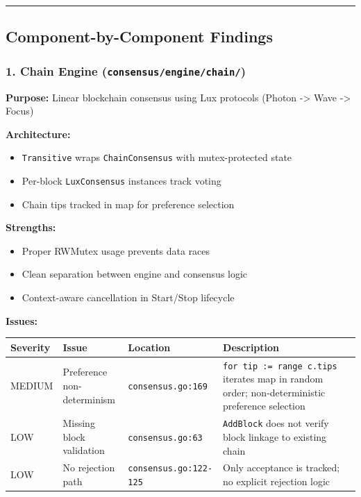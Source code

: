 \documentclass[
]{article}
\newcounter{none} %
\providecommand{\tightlist}{%
  \setlength{\itemsep}{0pt}\setlength{\parskip}{0pt}}
\begin{document}
\begin{center}\rule{0.5\linewidth}{0.5pt}\end{center}

\subsection{Component-by-Component
Findings}\label{component-by-component-findings}

\subsubsection{\texorpdfstring{1. Chain Engine
(\texttt{consensus/engine/chain/})}{1. Chain Engine (consensus/engine/chain/)}}\label{1-chain-engine-consensusenginechain}

\textbf{Purpose:} Linear blockchain consensus using Lux protocols
(Photon -\textgreater{} Wave -\textgreater{} Focus)

\textbf{Architecture:}

\begin{itemize}
\tightlist
\item
  \texttt{Transitive} wraps \texttt{ChainConsensus} with mutex-protected
  state
\item
  Per-block \texttt{LuxConsensus} instances track voting
\item
  Chain tips tracked in map for preference selection
\end{itemize}

\textbf{Strengths:}

\begin{itemize}
\tightlist
\item
  Proper RWMutex usage prevents data races
\item
  Clean separation between engine and consensus logic
\item
  Context-aware cancellation in Start/Stop lifecycle
\end{itemize}

\textbf{Issues:}

{\def\LTcaptype{none} %
\begin{longtable}[]{@{}llll@{}}
\toprule\noalign{}
Severity & Issue & Location & Description \\
\midrule\noalign{}
\endhead
\bottomrule\noalign{}
\endlastfoot
MEDIUM & Preference non-determinism & \texttt{consensus.go:169} &
\texttt{for\ tip\ :=\ range\ c.tips} iterates map in random order;
non-deterministic preference selection \\
LOW & Missing block validation & \texttt{consensus.go:63} &
\texttt{AddBlock} does not verify block linkage to existing chain \\
LOW & No rejection path & \texttt{consensus.go:122-125} & Only
acceptance is tracked; no explicit rejection logic \\
\end{longtable}
}
\end{document}
